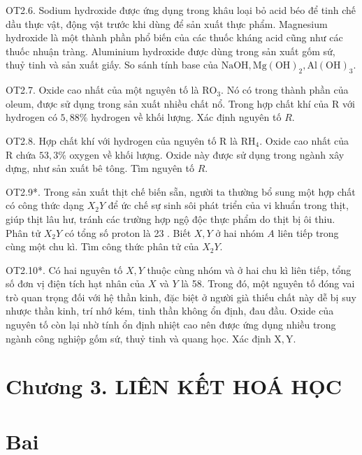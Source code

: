\documentclass[10pt]{article}
\begin{document}
OT2.6. Sodium hydroxide được ứng dụng trong khâu loại bỏ acid béo để tinh chế dầu thực vật, động vật trước khi dùng để sản xuất thực phẩm. Magnesium hydroxide là một thành phần phổ biến của các thuốc kháng acid cũng như các thuốc nhuận tràng. Aluminium hydroxide được dùng trong sản xuất gốm sứ, thuỷ tinh và sản xuất giấy. So sánh tính base của $\mathrm{NaOH}, \mathrm{Mg}(\mathrm{OH})_{2}, \mathrm{Al}(\mathrm{OH})_{3}$.

OT2.7. Oxide cao nhất của một nguyên tố là $\mathrm{RO}_{3}$. Nó có trong thành phần của oleum, được sử dụng trong sản xuất nhiều chất nổ. Trong hợp chất khí của R với hydrogen có $5,88 \%$ hydrogen về khối lượng. Xác định nguyên tố $R$.

OT2.8. Hợp chất khí với hydrogen của nguyên tố R là $\mathrm{RH}_{4}$. Oxide cao nhất của R chứa $53,3 \%$ oxygen về khối lượng. Oxide này được sử dụng trong ngành xây dựng, như sản xuất bê tông. Tìm nguyên tố $R$.

OT2.9*. Trong sản xuất thịt chế biến sẵn, người ta thường bổ sung một hợp chất có công thức dạng $X_{2} Y$ để ức chế sự sinh sôi phát triển của vi khuẩn trong thịt, giúp thịt lâu hư, tránh các trường hợp ngộ độc thực phẩm do thịt bị ôi thiu. Phân tử $X_{2} Y$ có tổng số proton là 23 . Biết $X, Y$ ở hai nhóm $A$ liên tiếp trong cùng một chu kì. Tìm công thức phân tử của $X_{2} Y$.

OT2.10*. Có hai nguyên tố $X, Y$ thuộc cùng nhóm và ở hai chu kì liên tiếp, tổng số đơn vị điện tích hạt nhân của $X$ và $Y$ là 58. Trong đó, một nguyên tố đóng vai trò quan trọng đối với hệ thần kinh, đặc biệt ở người già thiếu chất này dễ bị suy nhược thần kinh, trí nhớ kém, tinh thần không ổn định, đau đầu. Oxide của nguyên tố còn lại nhờ tính ổn định nhiệt cao nên được ứng dụng nhiều trong ngành công nghiệp gốm sứ, thuỷ tinh và quang học. Xác định $\mathrm{X}, \mathrm{Y}$.

\section*{Chương 3. LIÊN KẾT HOÁ HỌC}
\section*{Bai}
\end{document}
